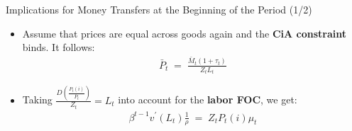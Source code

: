 \documentclass[10pt,c,aspectratio=1610,handout]{beamer}
\begin{document}
\begin{frame}{Implications for Money Transfers at the Beginning of the Period (1/2)}%
  \begin{itemize}%
    \item[$\blacktriangleright$] Assume that prices are equal across goods again and the \textbf{CiA constraint} binds. It follows:%
    \begin{align*}%
      \bar{P}_{t} \; = \; \frac{\bar{M}_{t}(1+\tau_{t})}{Z_{t}L_{t}}%
    \end{align*}%
    \vspace*{0.2in}%
    \item[$\blacktriangleright$] Taking $\frac{D \left( \frac{P_{t}(i)}{\bar{P}_{t}} \right)}{Z_t} = L_{t}$ into account for the \textbf{labor FOC}, we get:%
    \begin{align*}%
      \beta^{t-1} v^{\prime} \left(L_{t}\right) \frac{1}{\rho} \; = \; Z_{t} P_{t}(i) \mu_{t}%
    \end{align*}%
  \end{itemize}%
\end{frame}%
\end{document}
